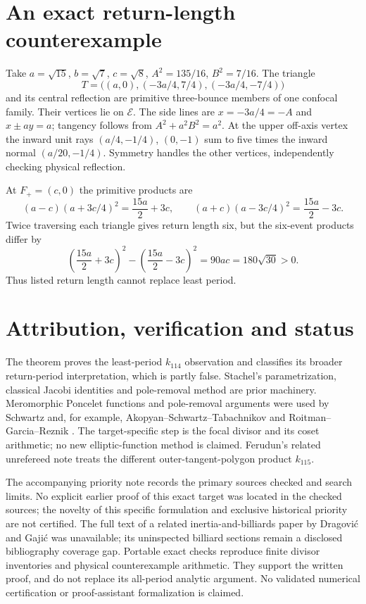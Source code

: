 \documentclass[11pt]{article}
\begin{document}
\section{An exact return-length counterexample}
Take \(a=\sqrt{15}\), \(b=\sqrt7\), \(c=\sqrt8\),
\(A^2=135/16\), \(B^2=7/16\).
The triangle
\[
 T=\bigl((a,0),(-3a/4,7/4),(-3a/4,-7/4)\bigr)
\]
and its central reflection are primitive three-bounce members of
one confocal family. Their vertices lie on \(\mathcal E\).
The side lines are \(x=-3a/4=-A\) and \(x\pm ay=a\);
tangency follows from \(A^2+a^2B^2=a^2\).
At the upper off-axis vertex the inward unit rays
\((a/4,-1/4)\), \((0,-1)\) sum to five times the inward normal
\((a/20,-1/4)\). Symmetry handles the other vertices, independently
checking physical reflection.

At \(F_+=(c,0)\) the primitive products are
\[
 (a-c)(a+3c/4)^2=\frac{15a}{2}+3c,\qquad
 (a+c)(a-3c/4)^2=\frac{15a}{2}-3c.
\]
Twice traversing each triangle gives return length six, but the
six-event products differ by
\[
 \left(\frac{15a}{2}+3c\right)^2-
 \left(\frac{15a}{2}-3c\right)^2=90ac=180\sqrt{30}>0.
\]
Thus listed return length cannot replace least period.

\section{Attribution, verification and status}
The theorem proves the least-period \(k_{114}\) observation and
classifies its broader return-period interpretation, which is partly
false. Stachel's parametrization, classical Jacobi identities and
pole-removal method are prior machinery.
Meromorphic Poncelet functions and pole-removal arguments were used
by Schwartz \cite{schwartz} and, for example,
Akopyan--Schwartz--Tabachnikov \cite{ast} and
Roitman--Garcia--Reznik \cite{bicentric}.
The target-specific step is the focal divisor and its coset arithmetic;
no new elliptic-function method is claimed.
Ferudun's related unrefereed note \cite{ferudun} treats the different
outer-tangent-polygon product \(k_{115}\).

The accompanying priority note records the primary sources checked
and search limits. No explicit earlier proof of this exact target was
located in the checked sources; the novelty of this specific formulation
and exclusive historical priority are not certified.
The full text of a related inertia-and-billiards paper by
Dragovi\'c and Gaji\'c \cite{dg} was unavailable; its uninspected
billiard sections remain a disclosed bibliography coverage gap.
Portable exact checks reproduce finite divisor inventories and
physical counterexample arithmetic. They support the written proof,
and do not replace its all-period analytic argument.
No validated numerical certification or proof-assistant formalization
is claimed.
\end{document}
